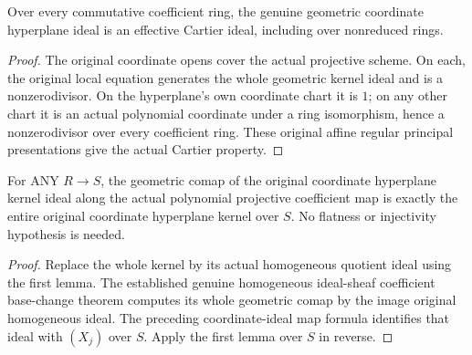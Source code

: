 \begin{lemma}
\label{projective:actual-coordinate-hyperplane-geometric-cartier}
\leanok
Over every commutative coefficient ring, the genuine geometric coordinate
hyperplane ideal is an effective Cartier ideal, including over nonreduced rings.
\end{lemma}
\begin{proof}
The original coordinate opens cover the actual projective scheme. On each,
the original local equation generates the whole geometric kernel ideal and
is a nonzerodivisor. On the hyperplane's own coordinate chart it is $1$;
on any other chart it is an actual polynomial coordinate under a ring
isomorphism, hence a nonzerodivisor over every coefficient ring. These
original affine regular principal presentations give the actual Cartier property.
\end{proof}

\begin{lemma}
\label{projective:actual-coordinate-hyperplane-whole-comap}
\leanok
{}
For ANY $R\to S$, the geometric comap of the original coordinate hyperplane
kernel ideal along the actual polynomial projective coefficient map is exactly
the entire original coordinate hyperplane kernel over $S$. No flatness or
injectivity hypothesis is needed.
\end{lemma}
\begin{proof}
Replace the whole kernel by its actual homogeneous quotient ideal using the
first lemma. The established genuine homogeneous ideal-sheaf coefficient
base-change theorem computes its whole geometric comap by the image original
homogeneous ideal. The preceding coordinate-ideal map formula identifies that
ideal with $(X_j)$ over $S$. Apply the first lemma over $S$ in reverse.
\end{proof}

